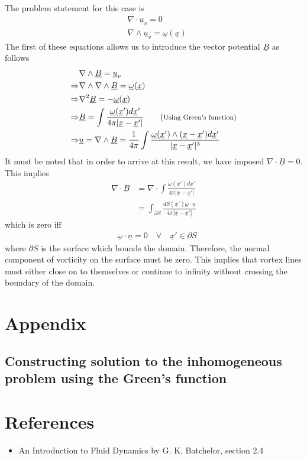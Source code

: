 \documentclass[11pt,a4paper]{article}
\newcommand{\vect}[1]{\underline{#1}}
\newcommand{\1}{\vect{1}}
\newcommand{\grad}{\nabla}
\newcommand{\curl}[1]{\nabla\wedge\vect{#1}}
\newcommand{\divg}[1]{\nabla\cdot\vect{#1}}
\newcommand{\RA}{\Rightarrow}
\newcommand{\smalltag}[1]{\tag{\footnotesize{#1}}}
\begin{document}
The problem statement for this case is
\begin{align*}
&\divg{u}_v = 0\\
&\curl{u}_v = \vect\omega(\vect x)
\end{align*}
The first of these equations allows us to introduce the vector potential $\vect B$ as follows
\begin{align*}
&\curl{B} = \vect{u}_v \\
\RA&\grad\wedge\grad\wedge\vect B = \vect\omega(\vect x)\\
\RA&\grad^2\vect B = -\vect\omega(\vect x)\\
\RA&\vect B = \int \frac{\vect\omega(\vect x') d\vect x'}{4\pi |\vect x-\vect x'|} \smalltag{Using Green's function}\\
\RA&\vect u = \curl B = \frac{1}{4\pi}\int \frac{\vect\omega(\vect x')\wedge(\vect x-\vect x') d\vect x'}{|\vect x-\vect x'|^3}
\end{align*}
It must be noted that in order to arrive at this result, we have imposed $\divg B = 0$. This implies
\begin{align*}
\divg B &= \grad\cdot\int \frac{\vect\omega(\vect x') d\vect x'}{4\pi |\vect x-\vect x'|}\\
&= \int_{\partial S} \frac{dS(\vect x') \vect \omega \cdot \vect n}{4\pi|\vect x- \vect x'|}
\end{align*} 
which is zero iff
\begin{align*}
&\vect \omega \cdot \vect n = 0 \quad \forall \quad \vect x' \in \partial S
\end{align*}
where $\partial S$ is the surface which bounds the domain. Therefore, the normal component of vorticity on the surface must be zero. This implies that vortex lines must either close on to themselves or continue to infinity without crossing the boundary of the domain.

\section{Appendix}

\subsection{Constructing solution to the inhomogeneous problem using the Green's function}

\section{References}
\begin{itemize}
\item An Introduction to Fluid Dynamics by G. K. Batchelor, section 2.4
\end{itemize}
\end{document}
